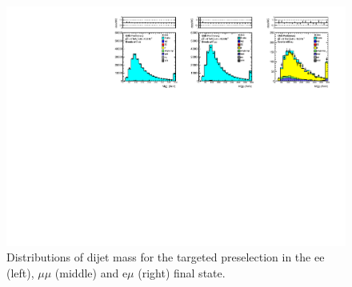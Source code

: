 \clearpage

\begin{figure}[hbt]
  \begin{center}
	\includegraphics[width=1.0\linewidth]{plots/mjj_targeted_19fb.pdf}
	\caption{
	  \label{fig:mjj}\protect 
Distributions of dijet mass for the targeted preselection in the ee (left), $\mu\mu$ (middle) and e$\mu$ (right) final state.
}                   
  \end{center}
\end{figure}





